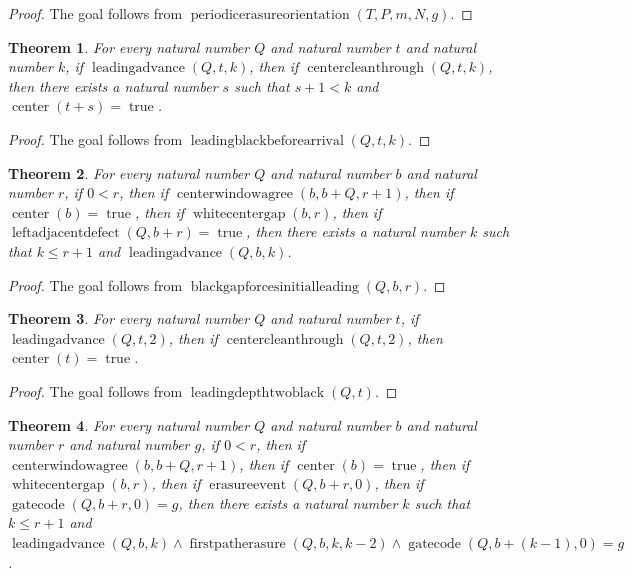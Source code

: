 \documentclass[11pt]{article}
\newtheorem{theorem}{Theorem}[section]
\theoremstyle{definition}
\begin{document}
\begin{proof}
The goal follows from \(\operatorname{periodicerasureorientation}(T, P, m, N, g)\).
\end{proof}
\begin{theorem}
\label{ll:observations:leading-black-before-arrival}
For every natural number \(Q\) and natural number \(t\) and natural number \(k\), if \(\operatorname{leadingadvance}(Q, t, k)\), then if \(\operatorname{centercleanthrough}(Q, t, k)\), then there exists a natural number \(s\) such that \(s + 1 < k\) and \(\operatorname{center}(t + s) = \operatorname{true}\).
\end{theorem}
\begin{proof}
The goal follows from \(\operatorname{leadingblackbeforearrival}(Q, t, k)\).
\end{proof}
\begin{theorem}
\label{ll:observations:black-gap-forces-initial-leading}
For every natural number \(Q\) and natural number \(b\) and natural number \(r\), if \(0 < r\), then if \(\operatorname{centerwindowagree}(b, b + Q, r + 1)\), then if \(\operatorname{center}(b) = \operatorname{true}\), then if \(\operatorname{whitecentergap}(b, r)\), then if \(\operatorname{leftadjacentdefect}(Q, b + r) = \operatorname{true}\), then there exists a natural number \(k\) such that \(k \le r + 1\) and \(\operatorname{leadingadvance}(Q, b, k)\).
\end{theorem}
\begin{proof}
The goal follows from \(\operatorname{blackgapforcesinitialleading}(Q, b, r)\).
\end{proof}
\begin{theorem}
\label{ll:observations:leading-depth-two-black}
For every natural number \(Q\) and natural number \(t\), if \(\operatorname{leadingadvance}(Q, t, 2)\), then if \(\operatorname{centercleanthrough}(Q, t, 2)\), then \(\operatorname{center}(t) = \operatorname{true}\).
\end{theorem}
\begin{proof}
The goal follows from \(\operatorname{leadingdepthtwoblack}(Q, t)\).
\end{proof}
\begin{theorem}
\label{ll:observations:black-gap-erasure-origin}
For every natural number \(Q\) and natural number \(b\) and natural number \(r\) and natural number \(g\), if \(0 < r\), then if \(\operatorname{centerwindowagree}(b, b + Q, r + 1)\), then if \(\operatorname{center}(b) = \operatorname{true}\), then if \(\operatorname{whitecentergap}(b, r)\), then if \(\operatorname{erasureevent}(Q, b + r, 0)\), then if \(\operatorname{gatecode}(Q, b + r, 0) = g\), then there exists a natural number \(k\) such that \(k \le r + 1\) and \(\operatorname{leadingadvance}(Q, b, k) \land \operatorname{firstpatherasure}(Q, b, k, k - 2) \land \operatorname{gatecode}(Q, b + (k - 1), 0) = g\).
\end{theorem}
\end{document}

